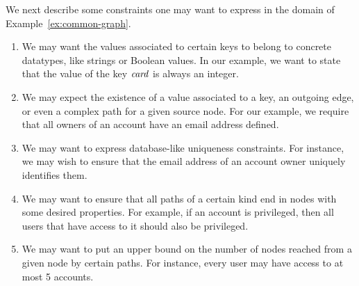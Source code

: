 \begin{example}
  \label{ex:constraint-desc}
  We next describe some constraints one may want to express in the domain of
  Example~\ref{ex:common-graph}.
  \begin{enumerate}[(C1)]
  \item
    We may want the values associated to certain keys to belong to concrete
    datatypes, like strings or Boolean values.
    In our example, we want to state that the value of the key $\mathit{card}$ is
    always an integer.
  \item
    We may expect the existence of a value associated to a key, an outgoing
    edge, or even a complex path for a given source node.
    For our example, we require that all owners of an account have an email
    address defined.
  \item
    We may want to express database-like uniqueness constraints.
    For instance, we may wish to ensure that the email address of an account
    owner uniquely identifies them.
  \item
    We may want to ensure that all paths of a certain kind end in nodes with
    some desired properties. For example, if an account is privileged, then all
    users that have access to it should also be privileged.
  \item
    We may want to put an upper bound on the number of nodes reached from a
    given node by certain paths. For instance, every user may have access to at
    most 5 accounts.
\end{enumerate}


\end{example}

